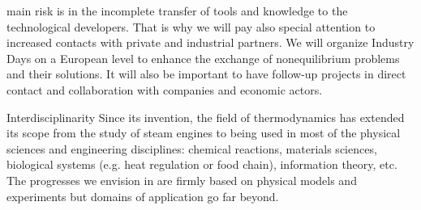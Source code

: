 \begin{compactdesc}
main risk is in the incomplete transfer of tools and knowledge to the technological
developers.  That is why we will pay also special attention to increased contacts with
private and industrial partners.  We will organize Industry Days on a European level to
enhance the exchange of nonequilibrium problems and their solutions.  It will also be
important to have follow-up projects in direct contact and collaboration with companies and
economic actors.
\item[Interdisciplinarity] Since its invention, the field of thermodynamics has extended its
scope from the study of steam engines to being used in most of the physical sciences and
engineering disciplines: chemical reactions, materials sciences, biological systems
(e.g. heat regulation or food chain), information theory, etc. The progresses we envision in
\TheProject are firmly based on physical models and experiments but domains of application
go far beyond.
\end{compactdesc}



